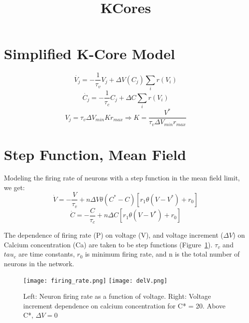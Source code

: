 \documentclass[11pt,letterpaper]{article}
\title{KCores}
\begin{document}

\maketitle


\section*{Simplified K-Core Model}
\begin{equation}\label{eq:kcore}
\dot{V_j} = -\frac{1}{\tau _v} V_j + \Delta V(C_j) \sum_i r(V_i)
\end{equation}
\begin{equation}\label{eq:kcore2}
\dot{C_j} = -\frac{1}{\tau _c} C_j + \Delta C \sum_i r(V_i)
\end{equation}
\begin{equation}\label{eq:k_of_kcore}
V_j = \tau _v \Delta V_{min} K r_{max} \Rightarrow K = \frac{V^*}{\tau _v \Delta V_{min} r_{max}}
\end{equation}


\section*{Step Function, Mean Field}
Modeling the firing rate of neurons with a step function in the mean field limit, we get:
\begin{equation}\label{eq:step_mean_field}
\dot{V} = -\frac{V}{\tau _v} + n\Delta V \theta (C^* - C)[r_1\theta (V - V^*) + r_0]
\end{equation}
\begin{equation}
\dot{C} = -\frac{C}{\tau _c} + n\Delta C [r_1 \theta (V - V^*) + r_0]
\end{equation}

The dependence of firing rate (P) on voltage (V), and voltage increment ($\Delta V$) on Calcium concentration (Ca) are taken to be step functions (Figure~\ref{fig:step_function}). $\tau _v$ and $tau _c$ are time constants, $r_0$ is minimum firing rate, and n is the total number of neurons in the network.

\begin{figure}[!h]
  \centering
  	\texttt{[image: firing\_rate.png]}
    \texttt{[image: delV.png]}
  \caption{Left: Neuron firing rate as a function of voltage. Right: Voltage increment dependence on calcium concentration for C* = 20. Above C*, $\Delta V = 0$}
  \label{fig:step_function}
\end{figure}
\end{document}

